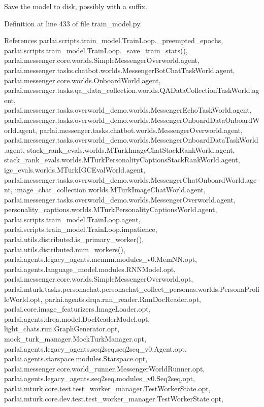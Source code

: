 \begin{DoxyVerb}Save the model to disk, possibly with a suffix.\end{DoxyVerb}
 

Definition at line 433 of file train\+\_\+model.\+py.



References parlai.\+scripts.\+train\+\_\+model.\+Train\+Loop.\+\_\+preempted\+\_\+epochs, parlai.\+scripts.\+train\+\_\+model.\+Train\+Loop.\+\_\+save\+\_\+train\+\_\+stats(), parlai.\+messenger.\+core.\+worlds.\+Simple\+Messenger\+Overworld.\+agent, parlai.\+messenger.\+tasks.\+chatbot.\+worlds.\+Messenger\+Bot\+Chat\+Task\+World.\+agent, parlai.\+messenger.\+core.\+worlds.\+Onboard\+World.\+agent, parlai.\+messenger.\+tasks.\+qa\+\_\+data\+\_\+collection.\+worlds.\+Q\+A\+Data\+Collection\+Task\+World.\+agent, parlai.\+messenger.\+tasks.\+overworld\+\_\+demo.\+worlds.\+Messenger\+Echo\+Task\+World.\+agent, parlai.\+messenger.\+tasks.\+overworld\+\_\+demo.\+worlds.\+Messenger\+Onboard\+Data\+Onboard\+World.\+agent, parlai.\+messenger.\+tasks.\+chatbot.\+worlds.\+Messenger\+Overworld.\+agent, parlai.\+messenger.\+tasks.\+overworld\+\_\+demo.\+worlds.\+Messenger\+Onboard\+Data\+Task\+World.\+agent, stack\+\_\+rank\+\_\+evals.\+worlds.\+M\+Turk\+Image\+Chat\+Stack\+Rank\+World.\+agent, stack\+\_\+rank\+\_\+evals.\+worlds.\+M\+Turk\+Personality\+Captions\+Stack\+Rank\+World.\+agent, igc\+\_\+evals.\+worlds.\+M\+Turk\+I\+G\+C\+Eval\+World.\+agent, parlai.\+messenger.\+tasks.\+overworld\+\_\+demo.\+worlds.\+Messenger\+Chat\+Onboard\+World.\+agent, image\+\_\+chat\+\_\+collection.\+worlds.\+M\+Turk\+Image\+Chat\+World.\+agent, parlai.\+messenger.\+tasks.\+overworld\+\_\+demo.\+worlds.\+Messenger\+Overworld.\+agent, personality\+\_\+captions.\+worlds.\+M\+Turk\+Personality\+Captions\+World.\+agent, parlai.\+scripts.\+train\+\_\+model.\+Train\+Loop.\+agent, parlai.\+scripts.\+train\+\_\+model.\+Train\+Loop.\+impatience, parlai.\+utils.\+distributed.\+is\+\_\+primary\+\_\+worker(), parlai.\+utils.\+distributed.\+num\+\_\+workers(), parlai.\+agents.\+legacy\+\_\+agents.\+memnn.\+modules\+\_\+v0.\+Mem\+N\+N.\+opt, parlai.\+agents.\+language\+\_\+model.\+modules.\+R\+N\+N\+Model.\+opt, parlai.\+messenger.\+core.\+worlds.\+Simple\+Messenger\+Overworld.\+opt, parlai.\+mturk.\+tasks.\+personachat.\+personachat\+\_\+collect\+\_\+personas.\+worlds.\+Persona\+Profile\+World.\+opt, parlai.\+agents.\+drqa.\+rnn\+\_\+reader.\+Rnn\+Doc\+Reader.\+opt, parlai.\+core.\+image\+\_\+featurizers.\+Image\+Loader.\+opt, parlai.\+agents.\+drqa.\+model.\+Doc\+Reader\+Model.\+opt, light\+\_\+chats.\+run.\+Graph\+Generator.\+opt, mock\+\_\+turk\+\_\+manager.\+Mock\+Turk\+Manager.\+opt, parlai.\+agents.\+legacy\+\_\+agents.\+seq2seq.\+seq2seq\+\_\+v0.\+Agent.\+opt, parlai.\+agents.\+starspace.\+modules.\+Starspace.\+opt, parlai.\+messenger.\+core.\+world\+\_\+runner.\+Messenger\+World\+Runner.\+opt, parlai.\+agents.\+legacy\+\_\+agents.\+seq2seq.\+modules\+\_\+v0.\+Seq2seq.\+opt, parlai.\+mturk.\+core.\+test.\+test\+\_\+worker\+\_\+manager.\+Test\+Worker\+State.\+opt, parlai.\+mturk.\+core.\+dev.\+test.\+test\+\_\+worker\+\_\+manager.\+Test\+Worker\+State.\+opt, 